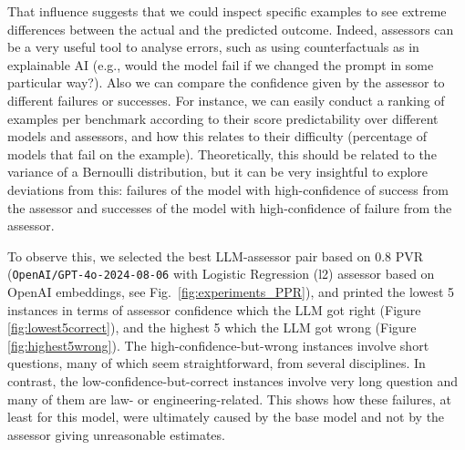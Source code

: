 \documentclass[11pt]{article}
\begin{document}
That influence suggests that we could inspect specific examples to see extreme differences between the actual and the predicted outcome. Indeed, assessors can be a very useful tool to analyse errors, such as using counterfactuals as in explainable AI (e.g., would the model fail if we changed the prompt in some particular way?). Also we can compare the confidence given by the assessor to different failures or successes. For instance, we can easily conduct a ranking of examples per benchmark according to their score predictability over different models and assessors, and how this relates to their difficulty (percentage of models that fail on the example). Theoretically, this should be related to the variance of a Bernoulli distribution, but it can be very insightful to explore deviations from this: failures of the model with high-confidence of success from the assessor and successes of the model with high-confidence of failure from the assessor.

To observe this, we selected the best LLM-assessor pair based on 0.8 PVR (\texttt{OpenAI/GPT-4o-2024-08-06} with Logistic Regression (l2) assessor based on OpenAI embeddings, see Fig.~\ref{fig:experiments_PPR}), and printed the lowest 5 instances in terms of assessor confidence which the LLM got right (Figure \ref{fig:lowest5correct}), and the highest 5 which the LLM got wrong (Figure \ref{fig:highest5wrong}). The high-confidence-but-wrong instances involve short questions, many of which seem straightforward, from several disciplines. In contrast, the low-confidence-but-correct instances involve very long question and many of them are law- or engineering-related. This shows how these failures, at least for this model, were ultimately caused by the base model and not by the assessor giving unreasonable estimates. 
\end{document}
